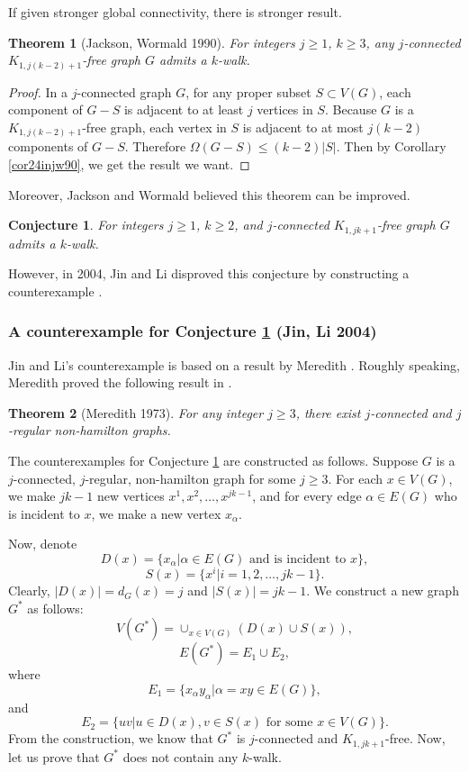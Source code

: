 \documentclass[12pt]{report}
\newtheorem{theorem}{Theorem}
\newtheorem{conjecture}{Conjecture}
\begin{document}
If given stronger global connectivity, there is stronger result.

\begin{theorem}[Jackson, Wormald 1990]\label{globconkw}
For integers $j\ge1$, $k\ge3$, any $j$-connected $K_{1,j(k-2)+1}$-free graph $G$ admits a $k$-walk.
\end{theorem}


\begin{proof}
In a $j$-connected graph $G$, for any proper subset $S\subset V(G)$, each component of $G-S$ is adjacent to at least $j$ vertices in $S$. Because $G$ is a $K_{1,j(k-2)+1}$-free graph, each vertex in $S$ is adjacent to at most $j(k-2)$ components of $G-S$. Therefore $\Omega(G-S)\le(k-2)|S|$. Then by Corollary \ref{cor24injw90}, we get the result we want.



\end{proof}

Moreover, Jackson and Wormald believed this theorem can be improved.

\begin{conjecture}\label{jck1jkfc}
For integers $j\ge1$, $k\ge2$, and $j$-connected $K_{1,jk+1}$-free graph $G$ admits a $k$-walk.
\end{conjecture}

However, in 2004, Jin and Li disproved this conjecture by constructing a counterexample \cite{jin2004conjecture}.
\subsubsection{A counterexample for Conjecture \ref{jck1jkfc} (Jin, Li 2004)}
Jin and Li's counterexample is based on a result by Meredith \cite{meredith1973regular}. Roughly speaking, Meredith proved the following result in \cite{meredith1973regular}.
\begin{theorem}[Meredith 1973]\label{mergenthm1}
For any integer $j\ge3$, there exist $j$-connected and $j$-regular non-hamilton graphs.
\end{theorem}



The counterexamples for Conjecture \ref{jck1jkfc} are constructed as follows. Suppose $G$ is a $j$-connected, $j$-regular, non-hamilton graph for some $j\ge3$. For each $x\in V(G)$, we make $jk-1$ new vertices $x^1,x^2,\ldots,x^{jk-1}$, and for every edge $\alpha\in E(G)$ who is incident to $x$, we make a new vertex $x_{\alpha}$.

Now, denote
$$D(x)=\{x_{\alpha}|\alpha\in E(G)\text{ and is incident to }x\},$$
$$S(x)=\{x^i|i=1,2,\ldots,jk-1\}.$$
Clearly, $|D(x)|=d_G(x)=j$ and $|S(x)|=jk-1$. We construct a new graph $G^*$ as follows:
$$V(G^*)=\cup_{x\in V(G)}(D(x)\cup S(x)),$$
$$E(G^*)=E_1\cup E_2,$$
where
$$E_1=\{x_{\alpha}y_{\alpha}|\alpha=xy\in E(G)\},$$
and
$$E_2=\{uv|u\in D(x),v\in S(x)\text{ for some }x\in V(G)\}.$$
From the construction, we know that $G^*$ is $j$-connected and $K_{1,jk+1}$-free. Now, let us prove that $G^*$ does not contain any $k$-walk.
\end{document}
